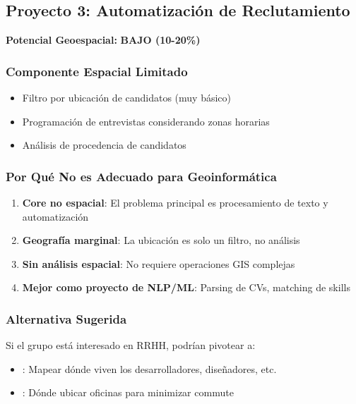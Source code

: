 \documentclass[11pt,a4paper]{article}
\newcommand{\bajo}[1]{\textcolor{rojo}{\textbf{#1}}}
\begin{document}
\newpage

\subsection{Proyecto 3: Automatización de Reclutamiento}

\begin{tcolorbox}[colframe=rojo,colback=red!10]
\textbf{Potencial Geoespacial:} \bajo{BAJO (10-20\%)}
\end{tcolorbox}

\subsubsection{Componente Espacial Limitado}

\begin{itemize}
    \item Filtro por ubicación de candidatos (muy básico)
    \item Programación de entrevistas considerando zonas horarias
    \item Análisis de procedencia de candidatos
\end{itemize}

\subsubsection{Por Qué No es Adecuado para Geoinformática}

\begin{enumerate}
    \item \textbf{Core no espacial}: El problema principal es procesamiento de texto y automatización
    \item \textbf{Geografía marginal}: La ubicación es solo un filtro, no análisis
    \item \textbf{Sin análisis espacial}: No requiere operaciones GIS complejas
    \item \textbf{Mejor como proyecto de NLP/ML}: Parsing de CVs, matching de skills
\end{enumerate}

\subsubsection{Alternativa Sugerida}
Si el grupo está interesado en RRHH, podrían pivotear a:
\begin{itemize}
    \item {}: Mapear dónde viven los desarrolladores, diseñadores, etc.
    \item {}: Dónde ubicar oficinas para minimizar commute
\end{itemize}
\end{document}
